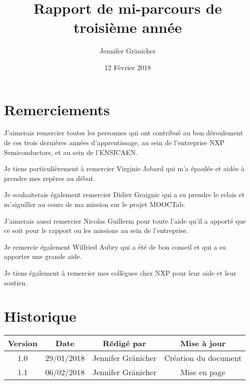 \documentclass[french,12pt,a4paper,titlepage,openright,openbib]{report}
\title{Rapport de mi-parcours de troisième année}
\author{Jennifer Gr\"{a}nicher}
\date{12 Février 2018}
\begin{document}



\maketitle

\chapter*{Remerciements}
J'aimerais remercier toutes les personnes qui ont contribué au bon déroulement de ces trois dernières années d'apprentissage, au sein de l'entreprise NXP Semiconductors, et au sein de l'ENSICAEN.

Je tiens particulièrement à remercier Virginie Jobard qui m'a épaulée et aidée à prendre mes repères au début.

Je souhaiterais également remercier Didier Graignic qui a su prendre le relais et m'aiguiller au cours de ma mission sur le projet MOOCTab.

J'aimerais aussi remercier Nicolas Guillerm pour toute l'aide qu'il a apporté que ce soit pour le rapport ou les missions au sein de l'entreprise.

Je remercie également Wilfried Aubry qui a été de bon conseil et qui a su apporter une grande aide.

Je tiens également à remercier mes collègues chez NXP pour leur aide et leur soutien.

\tableofcontents

\chapter*{Historique}
\begin{table}[ht]
	\label{tab:historique}
	\centering
	\begin{tabular}{|c|c|c|c|}
		\hline
		{\bf Version} & {\bf Date} & {\bf Rédigé par}    & {\bf Mise à jour}    \\
		\hline
		1.0           & 29/01/2018 & Jennifer Gränicher  & Création du document \\
		\hline
		1.1           & 06/02/2018 & Jennifer Gränicher  & Mise en page \\
		\hline
	\end{tabular}
\end{table}

\vspace{2cm}
\end{document}
